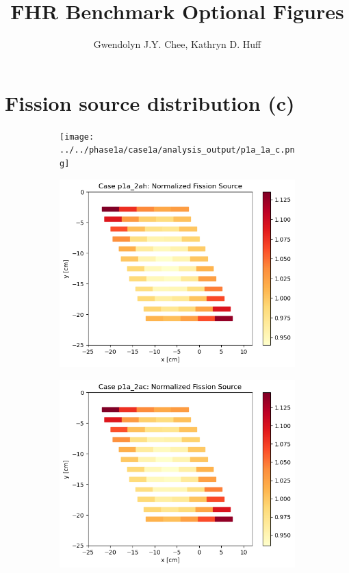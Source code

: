 \documentclass[letterpaper,11pt]{report}
\author{Gwendolyn J.Y. Chee, Kathryn D. Huff}
\title{FHR Benchmark Optional Figures }
\begin{document}
\maketitle

\section{Fission source distribution (c)}
\begin{figure}[H]
    \centering
    \begin{subfigure}{.33\textwidth}
        \centering
        \texttt{[image: ../../phase1a/case1a/analysis\_output/p1a\_1a\_c.png]}
        \caption{}
      \end{subfigure}%
      \begin{subfigure}{.33\textwidth}
        \centering
        \includegraphics[width=\linewidth]{../../phase1a/case2ah/analysis_output/p1a_2ah_c.png}
        \caption{}
      \end{subfigure}
      \begin{subfigure}{.33\textwidth}
        \centering
        \includegraphics[width=\linewidth]{../../phase1a/case2ac/analysis_output/p1a_2ac_c.png}

\end{subfigure}
\end{figure}
\end{document}
